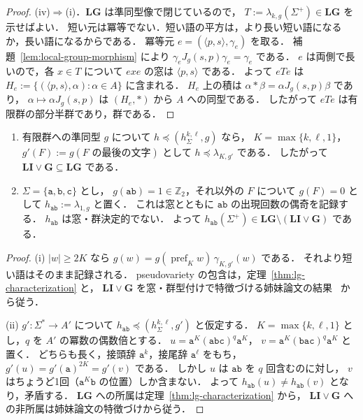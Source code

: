 \begin{proof}
(iv)$\Rightarrow$(i)．$\mathbf{LG}$ は準同型像で閉じているので，
$T:=\lambda_{k,g}(\Sigma^+)\in\mathbf{LG}$ を示せばよい．
短い元は冪等でない．短い語の平方は，より長い短い語になるか，長い語になるからである．
冪等元 $e=(\langle p,s\rangle,\gamma_e)$ を取る．
補題~\ref{lem:local-group-morphism} により $\gamma_eJ_g(s,p)\gamma_e=\gamma_e$ である．
$e$ は両側で長いので，各 $x\in T$ について $exe$ の窓は $\langle p,s\rangle$ である．
よって $eTe$ は $H_e:=\{(\langle p,s\rangle,\alpha):\alpha\in A\}$ に含まれる．
$H_e$ 上の積は $\alpha*\beta=\alpha J_g(s,p)\beta$ であり，
$\alpha\mapsto\alpha J_g(s,p)$ は $(H_e,*)$ から $A$ への同型である．
したがって $eTe$ は有限群の部分半群であり，群である．
\end{proof}

\begin{proposition}
\label{prop:li-g-strict}
\begin{enumerate}[label=\textup{(\roman*)},leftmargin=*]
\item 有限群への準同型 $g$ について $h\preceq(h^{k,\ell}_\Sigma,g)$ なら，
$K=\max\{k,\ell,1\}$，$g'(F):=g(F\text{ の最後の文字})$ として $h\preceq\lambda_{K,g'}$ である．
したがって $\mathbf{LI}\vee\mathbf G\subseteq\mathbf{LG}$ である．
\item $\Sigma=\{\mathtt a,\mathtt b,\mathtt c\}$ とし，
$g(\mathtt{ab})=1\in\mathbb Z_2$，それ以外の $F$ について $g(F)=0$ として
$h_{\mathtt{ab}}:=\lambda_{1,g}$ と置く．
これは窓とともに $\mathtt{ab}$ の出現回数の偶奇を記録する．
$h_{\mathtt{ab}}$ は窓・群決定的でない．
よって $h_{\mathtt{ab}}(\Sigma^+)\in\mathbf{LG}\setminus(\mathbf{LI}\vee\mathbf G)$ である．
\end{enumerate}
\end{proposition}

\begin{proof}
(i) $|w|\ge2K$ なら $g(w)=g(\operatorname{pref}_Kw)\,\gamma_{K,g'}(w)$ である．
それより短い語はそのまま記録される．
pseudovariety の包含は，定理~\ref{thm:lg-characterization} と，
$\mathbf{LI}\vee\mathbf G$ を窓・群型付けで特徴づける姉妹論文の結果~\cite[Lemma~7.4]{kuriyamaCFG} から従う．

(ii) $g':\Sigma^*\to A'$ について $h_{\mathtt{ab}}\preceq(h^{k,\ell}_\Sigma,g')$ と仮定する．
$K=\max\{k,\ell,1\}$ とし，$q$ を $A'$ の冪数の偶数倍とする．
$u=\mathtt a^K(\mathtt{abc})^q\mathtt a^K$，
$v=\mathtt a^K(\mathtt{bac})^q\mathtt a^K$ と置く．
どちらも長く，接頭辞 $\mathtt a^k$，接尾辞 $\mathtt a^\ell$ をもち，
$g'(u)=g'(\mathtt a)^{2K}=g'(v)$ である．
しかし $u$ は $\mathtt{ab}$ を $q$ 回含むのに対し，
$v$ はちょうど1回（$\mathtt a^K\mathtt b$ の位置）しか含まない．
よって $h_{\mathtt{ab}}(u)\ne h_{\mathtt{ab}}(v)$ となり，矛盾する．
$\mathbf{LG}$ への所属は定理~\ref{thm:lg-characterization} から，
$\mathbf{LI}\vee\mathbf G$ への非所属は姉妹論文の特徴づけから従う．
\end{proof}

